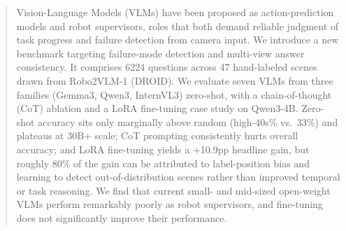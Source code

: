\begin{abstract}
Vision-Language Models (VLMs) have been proposed as action-prediction models and
robot supervisors, roles that both demand reliable judgment of task progress and failure
detection from camera input.
We introduce a new benchmark targeting failure-mode detection and multi-view answer consistency. It comprises 6224 questions across 47 hand-labeled scenes
drawn from Robo2VLM-1 (DROID).
We evaluate seven VLMs from three families (Gemma3, Qwen3, InternVL3) zero-shot,
with a chain-of-thought (CoT) ablation and a LoRA fine-tuning case study on Qwen3-4B.
Zero-shot accuracy sits only marginally above random (high-40s\% vs.\ 33\%) and plateaus
at 30B+ scale; CoT prompting consistently hurts overall accuracy; and LoRA fine-tuning
yields a +10.9pp headline gain, but roughly 80\% of the gain can be attributed to label-position bias and learning to detect out-of-distribution scenes rather than improved temporal or task reasoning.
We find that current small- and mid-sized open-weight VLMs perform remarkably poorly as robot supervisors, and
fine-tuning does not significantly improve their performance.
\end{abstract}
